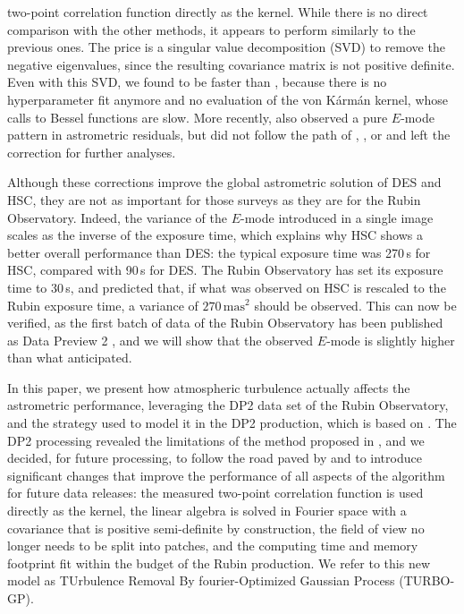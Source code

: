 two-point correlation function directly as the kernel.
While there is no direct comparison with the other methods, it appears to perform similarly to the previous ones.
The price is a singular value decomposition (SVD) to remove the negative eigenvalues, since the resulting covariance matrix is not positive definite.
Even with this SVD, we found  to be faster than , because there is no hyperparameter fit anymore and no evaluation of 
the von K\'arm\'an kernel, whose calls to Bessel functions are slow.
More recently, \citet[hereafter Y26]{2026AJ....171..238Y} also observed a pure $E$-mode pattern in astrometric residuals, 
but did not follow the path of , , or  and left the correction for further analyses.

Although these corrections improve the global astrometric solution of DES and HSC, they are not as important for those surveys as 
they are for the Rubin Observatory. Indeed, the variance of the $E$-mode introduced in a single image scales as the inverse of
the exposure time, which explains why HSC shows a better overall performance than DES: the typical exposure 
time was 270\,s for HSC, compared with 90\,s for DES. The Rubin Observatory has set its exposure time to 30\,s, and  predicted 
that, if what was observed on HSC is rescaled to the Rubin exposure time, a variance of $270\,\mathrm{mas}^2$ should be observed.
This can now be verified, as the first batch of data of the Rubin Observatory has been published as 
Data Preview 2 \citep[DP2;][]{10.71929/rubin/3382528}, and we will show that the observed $E$-mode is slightly higher than what  anticipated.

In this paper, we present how atmospheric turbulence actually affects the astrometric performance, leveraging the DP2 data set of 
the Rubin Observatory, and the strategy used to model it in the DP2 production, which is based on .
The DP2 processing revealed the limitations of the method proposed in , and we decided, for future processing, to follow the 
road paved by  and to introduce significant changes that improve the performance of all aspects of the algorithm for future data releases: 
the measured two-point correlation function is used directly as the kernel, the linear algebra is solved in Fourier space with a covariance 
that is positive semi-definite by construction, the field of view no longer needs to be split into patches, and the computing time and memory 
footprint fit within the budget of the Rubin production.
We refer to this new model as TUrbulence Removal By fourier-Optimized Gaussian Process (TURBO-GP).


